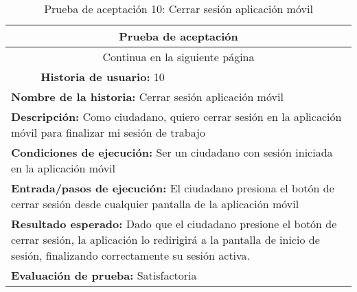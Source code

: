 \begin{longtable}{|p{6.7cm}|p{6.7cm}|}
    \caption{Prueba de aceptación 10: Cerrar sesión aplicación móvil} \label{tab:prueba-10}
    \\
    \hline
    \multicolumn{2}{|c|}{\textbf{Prueba de aceptación}}                                                                                                                                                                             \\
    \hline

    \endfirsthead

    \hline
    \endhead

    \hline
    \multicolumn{2}{|c|}{{Continua en la siguiente página}}                                                                                                                                                                         \\
    \hline
    \endfoot

    \hline
    \endlastfoot
    \multicolumn{1}{|p{6.7cm}|}{\textbf{Número} 10 } & \multicolumn{1}{|p{6.7cm}|}{\textbf{Historia de usuario:} 10}                                                                                                                \\
    \hline
    \multicolumn{2}{|p{13.4cm}|}{\textbf{Nombre de la historia:} Cerrar sesión aplicación móvil }                                                                                                                                   \\
    \hline
    \multicolumn{2}{|p{13.4cm}|}{\textbf{Descripción:} Como ciudadano, quiero cerrar sesión en la aplicación móvil para finalizar mi sesión de trabajo}                                                                             \\
    \hline
    \multicolumn{2}{|p{13.4cm}|}{\textbf{Condiciones de ejecución:} Ser un ciudadano con sesión iniciada en la aplicación móvil}                                                                                                    \\
    \hline
    \multicolumn{2}{|p{13.4cm}|}{\textbf{Entrada/pasos de ejecución:} El ciudadano presiona el botón de cerrar sesión desde cualquier pantalla de la aplicación móvil}                                                              \\
    \hline
    \multicolumn{2}{|p{13.4cm}|}{\textbf{Resultado esperado:} Dado que el ciudadano presione el botón de cerrar sesión, la aplicación lo redirigirá a la pantalla de inicio de sesión, finalizando correctamente su sesión activa.} \\
    \hline
    \multicolumn{2}{|p{13.4cm}|}{\textbf{Evaluación de prueba:} Satisfactoria}                                                                                                                                                      \\
    \hline
\end{longtable}


